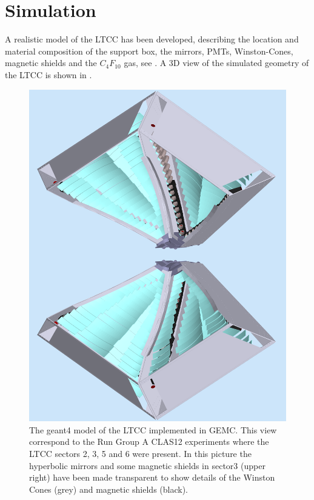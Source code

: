 \section{Simulation}

A realistic model of the LTCC has been developed, describing the location and material composition
of the support box, the mirrors, PMTs, Winston-Cones, magnetic shields and the $C_4F_{10}$ gas, see \cite{gemc2019}.
A 3D view of the simulated geometry of the LTCC is shown in .


\begin{figure}
	\centering
	\includegraphics[width=0.95\columnwidth,keepaspectratio]{img/simOverview.png}
	\caption{The geant4 model of the LTCC implemented in GEMC. This view correspond to the Run Group A CLAS12 experiments
				where the LTCC sectors 2, 3, 5 and 6 were present. In this picture the hyperbolic mirrors and some magnetic shields
            in sector3 (upper right) have been made transparent to show details of the Winston Cones (grey) and magnetic shields (black).}
	\label{fig:simOverview}
\end{figure}

